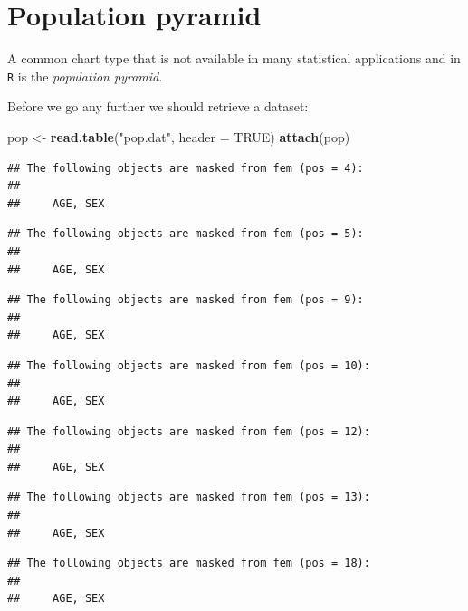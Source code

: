 \documentclass[12pt,a4paper]{book}
\newenvironment{Shaded}{\begin{snugshade}}{\end{snugshade}}
\newcommand{\DataTypeTok}[1]{\textcolor[rgb]{0.13,0.29,0.53}{#1}}
\newcommand{\KeywordTok}[1]{\textcolor[rgb]{0.13,0.29,0.53}{\textbf{#1}}}
\newcommand{\NormalTok}[1]{#1}
\newcommand{\OtherTok}[1]{\textcolor[rgb]{0.56,0.35,0.01}{#1}}
\newcommand{\StringTok}[1]{\textcolor[rgb]{0.31,0.60,0.02}{#1}}
\theoremstyle{definition}
\theoremstyle{definition}
\theoremstyle{definition}
\theoremstyle{remark}
\begin{document}
\hypertarget{population-pyramid}{%
\section{Population pyramid}\label{population-pyramid}}

A common chart type that is not available in many statistical
applications and in \texttt{R} is the \emph{population pyramid}.

Before we go any further we should retrieve a dataset:

\begin{Shaded}
\begin{Highlighting}[]
\NormalTok{pop <-}\StringTok{ }\KeywordTok{read.table}\NormalTok{(}\StringTok{"pop.dat"}\NormalTok{, }\DataTypeTok{header =} \OtherTok{TRUE}\NormalTok{)}
\KeywordTok{attach}\NormalTok{(pop)}
\end{Highlighting}
\end{Shaded}

\begin{verbatim}
## The following objects are masked from fem (pos = 4):
## 
##     AGE, SEX
\end{verbatim}

\begin{verbatim}
## The following objects are masked from fem (pos = 5):
## 
##     AGE, SEX
\end{verbatim}

\begin{verbatim}
## The following objects are masked from fem (pos = 9):
## 
##     AGE, SEX
\end{verbatim}

\begin{verbatim}
## The following objects are masked from fem (pos = 10):
## 
##     AGE, SEX
\end{verbatim}

\begin{verbatim}
## The following objects are masked from fem (pos = 12):
## 
##     AGE, SEX
\end{verbatim}

\begin{verbatim}
## The following objects are masked from fem (pos = 13):
## 
##     AGE, SEX
\end{verbatim}

\begin{verbatim}
## The following objects are masked from fem (pos = 18):
## 
##     AGE, SEX
\end{verbatim}
\end{document}
